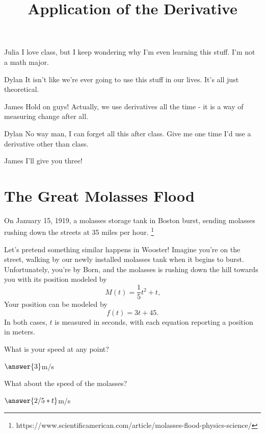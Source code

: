 \documentclass{ximera}
\title{Application of the Derivative}
\begin{document}
\maketitle
\begin{dialogue}
\item[Julia] I love class, but I keep wondering why I'm even learning this stuff. I'm not a math major.
\item[Dylan] It isn't like we're ever going to use this stuff in our lives. It's all just theoretical.
\item[James] Hold on guys! Actually, we use derivatives all the time - it is a way of measuring change after all.
\item[Dylan] No way man, I can forget all this after class. Give me one time I'd use a derivative other than class.
\item[James] I'll give you three!
\end{dialogue}
\section{The Great Molasses Flood}
On January 15, 1919, a molasses storage tank in Boston burst, sending molasses rushing down the streets at 35 miles per hour. \footnote{https://www.scientificamerican.com/article/molasses-flood-physics-science/}

Let's pretend something similar happens in Wooster! Imagine you're on the street, walking by our newly installed molasses tank when it begins to burst. Unfortunately, you're by Born, and the molasses is rushing down the hill towards you with its position modeled by $$M(t)=\frac{1}{5}t^2+t \text{,}$$ Your position can be modeled by $$f(t)=3t+45 \text{.}$$ In both cases, $t$ is measured in seconds, with each equation reporting a position in meters.

\setcounter{problem}{0}
\begin{question}
What is your speed at any point?

$\answer{3}$m/s

What about the speed of the molasses?

$\answer{2/5*t}$m/s
\end{question}
\end{document}
